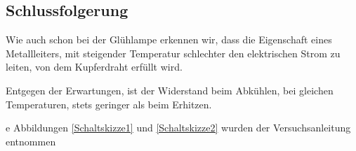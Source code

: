 \documentclass[11pt,a4paper,titlepage, ngerman]{article}
\begin{document}
		\subsection{Schlussfolgerung}	
			
			Wie auch schon bei der Glühlampe erkennen wir, dass die Eigenschaft eines Metallleiters, mit steigender Temperatur schlechter den elektrischen Strom zu leiten, von dem Kupferdraht erfüllt wird.
			
			Entgegen der Erwartungen, ist der Widerstand beim Abkühlen, bei gleichen Temperaturen, stets geringer als beim Erhitzen. %
		
	\begin{thebibliography}	
		e Abbildungen \ref{Schaltskizze1} und \ref{Schaltskizze2} wurden der Versuchsanleitung entnommen
	\end{thebibliography}	
			
\end{document}
